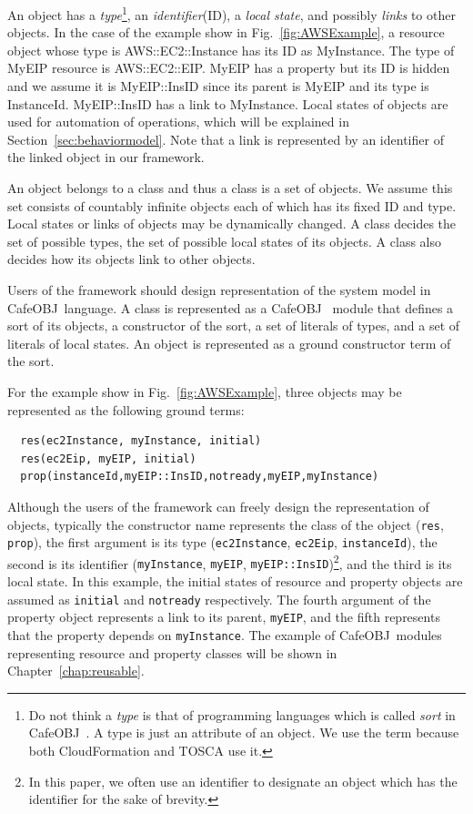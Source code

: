 \documentclass[12pt]{report}
\newcommand{\cafeobj}{{\sf CafeOBJ}~}
\begin{document}
An object has a {\it type}\footnote{Do not think a {\it type} is that
  of programming languages which is called {\it sort} in \cafeobj. A
  type is just an attribute of an object. We use the term because both
  CloudFormation and TOSCA use it.}, an {\it identifier}(ID), a {\it
  local state}, and possibly {\it links} to other objects. In the case
of the example show in Fig.~\ref{fig:AWSExample}, a resource object
whose type is AWS::EC2::Instance has its ID as MyInstance. The type of
MyEIP resource is AWS::EC2::EIP. MyEIP has a property but its ID is
hidden and we assume it is MyEIP::InsID since its parent is MyEIP and
its type is InstanceId. MyEIP::InsID has a link to MyInstance. Local
states of objects are used for automation of operations, which will be
explained in Section~\ref{sec:behaviormodel}. Note that a link is
represented by an identifier of the linked object in our framework.

An object belongs to a class and thus a class is a set of objects. We
assume this set consists of countably infinite objects each of which
has its fixed ID and type. Local states or links of objects may be
dynamically changed.  A class decides the set of possible types, the set
of possible local states of its objects. A class also decides how its
objects link to other objects.

Users of the framework should design representation of the system
model in \cafeobj language.  A class is represented as a \cafeobj
module that defines a sort of its objects, a constructor of the sort,
a set of literals of types, and a set of literals of local states.  An
object is represented as a ground constructor term of the sort.

For the example show in Fig.~\ref{fig:AWSExample}, three objects may
be represented as the following ground terms:
\begin{verbatim}
  res(ec2Instance, myInstance, initial)
  res(ec2Eip, myEIP, initial)
  prop(instanceId,myEIP::InsID,notready,myEIP,myInstance)
\end{verbatim}
Although the users of the framework can freely design the
representation of objects, typically the constructor name represents
the class of the object ({\tt res}, {\tt prop}), the first argument is
its type ({\tt ec2Instance}, {\tt ec2Eip}, {\tt instanceId}), the
second is its identifier ({\tt myInstance}, {\tt myEIP},
{\tt myEIP::InsID})\footnote{In this paper, we often use an identifier
  to designate an object which has the identifier for the sake of
  brevity.}, and the third is its local state. In this example, the
initial states of resource and property objects are assumed as
{\tt initial} and {\tt notready} respectively. The fourth argument of the
property object represents a link to its parent, {\tt myEIP}, and the
fifth represents that the property depends on {\tt myInstance}. The
example of \cafeobj modules representing resource and property classes
will be shown in Chapter~\ref{chap:reusable}.
\end{document}
